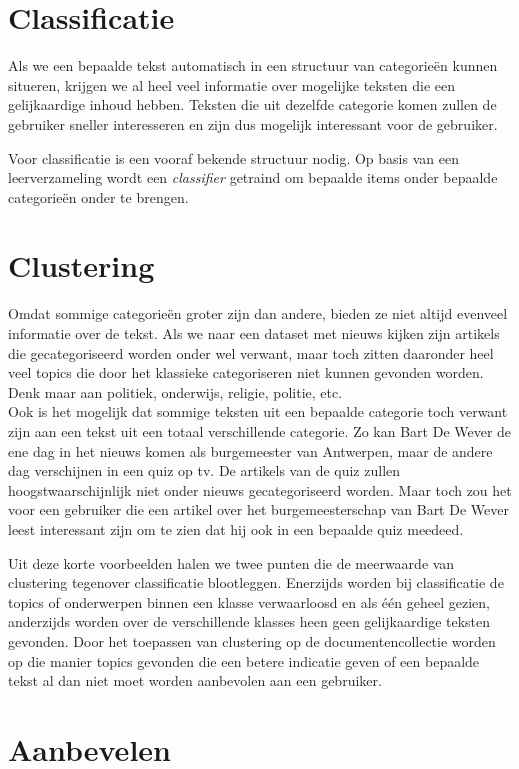 \section{Classificatie}
Als we een bepaalde tekst automatisch in een structuur van categorie\"en kunnen situeren, krijgen we al heel veel informatie over mogelijke teksten die een gelijkaardige inhoud hebben. Teksten die uit dezelfde categorie komen zullen de gebruiker sneller interesseren en zijn dus mogelijk interessant voor de gebruiker. 

Voor classificatie is een vooraf bekende structuur nodig. Op basis van een leerverzameling wordt een \textit{classifier} getraind om bepaalde items onder bepaalde categorie\"en onder te brengen.

\section{Clustering}
Omdat sommige categorie\"en groter zijn dan andere, bieden ze niet altijd evenveel informatie over de tekst. Als we naar een dataset met nieuws kijken zijn artikels die gecategoriseerd worden onder  wel verwant, maar toch zitten daaronder heel veel topics die door het klassieke categoriseren niet kunnen gevonden worden. Denk maar aan politiek, onderwijs, religie, politie, etc.
\\Ook is het mogelijk dat sommige teksten uit een bepaalde categorie toch verwant zijn aan een tekst uit een totaal verschillende categorie. Zo kan Bart De Wever de ene dag in het nieuws komen als burgemeester van Antwerpen, maar de andere dag verschijnen in een quiz op tv. De artikels van de quiz zullen hoogstwaarschijnlijk niet onder nieuws gecategoriseerd worden. Maar toch zou het voor een gebruiker die een artikel over het burgemeesterschap van Bart De Wever leest interessant zijn om te zien dat hij ook in een bepaalde quiz meedeed. 

Uit deze korte voorbeelden halen we twee punten die de meerwaarde van clustering tegenover classificatie blootleggen. Enerzijds worden bij classificatie de topics of onderwerpen binnen een klasse verwaarloosd en als \'e\'en geheel gezien, anderzijds worden over de verschillende klasses heen geen gelijkaardige teksten gevonden. Door het toepassen van clustering op de documentencollectie worden op die manier topics gevonden die een betere indicatie geven of een bepaalde tekst al dan niet moet worden aanbevolen aan een gebruiker. 

\section{Aanbevelen}



